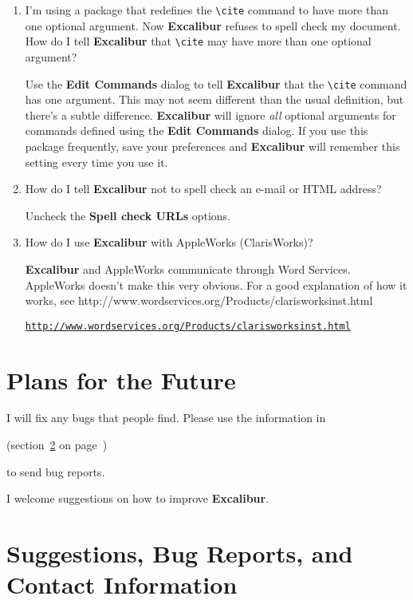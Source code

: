 \documentclass[11pt,titlepage]{article}
\newcommand{\ex}{\textbf{Excalibur}}
\begin{document}
\begin{enumerate}
\item I'm using a package that redefines the \verb+\cite+ command to
  have more than one optional argument.  Now \ex{} refuses to spell
  check my document.  How do I tell \ex{} that \verb+\cite+ may have
  more than one optional argument?

  Use the \textbf{Edit Commands} dialog to tell \ex{} that the
  \verb+\cite+ command has one argument.  This may not seem different
  than the usual definition, but there's a subtle difference.  \ex{}
  will ignore \emph{all} optional arguments for commands defined using
  the \textbf{Edit Commands} dialog.  If you use this package
  frequently, save your preferences and \ex{} will remember this
  setting every time you use it.

\item How do I tell \ex{} not to spell check an e-mail or HTML
  address?

  Uncheck the \textbf{Spell check URLs} options.

\item How do I use \ex{} with AppleWorks (ClarisWorks)?

  \ex{} and AppleWorks communicate through Word Services. AppleWorks
  doesn't make this very obvious.  For a good explanation of how it
  works, see 
  {http://www.wordservices.org/Products/clarisworksinst.html}
  \begin{latexonly}
\begin{alltt}
\url{http://www.wordservices.org/Products/clarisworksinst.html}
\end{alltt}
  \end{latexonly}

\end{enumerate}

\section{Plans for the Future}

I will fix any bugs that people find. Please use the information in
\begin{latexonly}
  (section~\ref{sec:bugs} on page~\pageref{sec:bugs})
\end{latexonly}
to send bug reports.

I welcome suggestions on how to improve \ex.

\section{Suggestions, Bug Reports, and Contact Information}
\label{sec:bugs}
\end{document}
